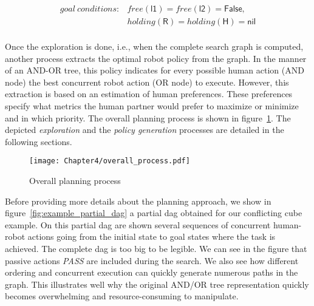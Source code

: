 {\small
\begin{align*}
goal~conditions: &free(\textsf{l1}) = free(\textsf{l2}) = \textsf{False}, \\
&holding(\textsf{R}) = holding(\textsf{H}) = \textsf{nil} \\
\end{align*}
}

Once the exploration is done, i.e., when the complete search graph is computed, another process extracts the optimal robot policy from the graph. In the manner of an AND-OR tree, this policy indicates for every possible human action (AND node) the best concurrent robot action (OR node) to execute. However, this extraction is based on an estimation of human preferences. These preferences specify what metrics the human partner would prefer to maximize or minimize and in which priority. The overall planning process is shown in figure~\ref{fig:overall_process}. The depicted \textit{exploration} and the \textit{policy generation} processes are detailed in the following sections.


\begin{figure}[h]
    \texttt{[image: Chapter4/overall\_process.pdf]}
    \caption{Overall planning process}
    \label{fig:overall_process}
\end{figure}

Before providing more details about the planning approach, we show in figure~\ref{fig:example_partial_dag} a partial \acrshort{dag} obtained for our conflicting cube example. On this partial \acrshort{dag} are shown several sequences of concurrent human-robot actions going from the initial state to goal states where the task is achieved. The complete \acrshort{dag} is too big to be legible. We can see in the figure that passive actions \textit{PASS} are included during the search. We also see how different ordering and concurrent execution can quickly generate numerous paths in the graph. This illustrates well why the original AND/OR tree representation quickly becomes overwhelming and resource-consuming to manipulate. 

